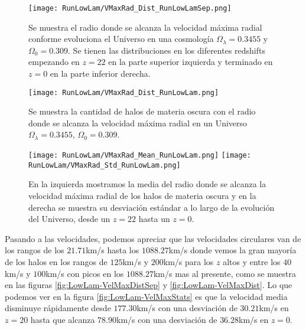 \begin{figure}[H]
    \centering
    \texttt{[image: RunLowLam/VMaxRad\_Dist\_RunLowLamSep.png]}
    \caption[Radio donde se alcanza la velocidad máxima radial]{\footnotesize Se muestra el radio donde se alcanza la velocidad máxima radial conforme evoluciona el Universo en una cosmología $\Omega_\lambda = 0.3455$ y $\Omega_0 = 0.309$. Se tienen las distribuciones en los diferentes redshifts empezando en $z=22$ en la parte superior izquierda y terminado en $z=0$ en la parte inferior derecha.}
    \label{fig:LowLam-VMaxRadDistSep}
\end{figure}

\begin{figure}[H]
    \centering
    \texttt{[image: RunLowLam/VMaxRad\_Dist\_RunLowLam.png]}
    \caption[Distribución del radio donde se alcanza la velocidad máxima radial]{\footnotesize Se muestra la cantidad de halos de materia oscura con el radio donde se alcanza la velocidad máxima radial en un Universo $\Omega_\lambda = 0.3455$, $\Omega_0 = 0.309$.}
    \label{fig:LowLam-VMaxRadDist}
\end{figure}

\begin{figure}[H]
    \centering
    \texttt{[image: RunLowLam/VMaxRad\_Mean\_RunLowLam.png]}
    \texttt{[image: RunLowLam/VMaxRad\_Std\_RunLowLam.png]}
    \caption[Media y desviación estándar del Radio donde se alcanza la velocidad máxima radial]{\footnotesize En la izquierda mostramos la media del radio donde se alcanza la velocidad máxima radial de los halos de materia oscura y en la derecha se muestra su desviación estándar a lo largo de la evolución del Universo, desde un $z=22$ hasta un $z=0$.}
    \label{fig:LowLam-VMaxRadStats}
\end{figure}

Pasando a las velocidades, podemos apreciar que las velocidades circulares van de los rangos de los $21.71$km/s hasta los $1088.27$km/s donde vemos la gran mayoría de los halos en los rangos de $125$km/s y $200$km/s para los $z$ altos y entre los $40$km/s y $100$km/s con picos en los $1088.27$km/s mas al presente, como se muestra en las figuras \ref{fig:LowLam-VelMaxDistSep} y \ref{fig:LowLam-VelMaxDist}. Lo que podemos ver en la figura \ref{fig:LowLam-VelMaxStats} es que la velocidad media disminuye rápidamente desde $177.30$km/s con una desviación de $30.21$km/s en $z=20$ hasta que alcanza $78.90$km/s con una desviación de $36.28$km/s en $z=0$.

